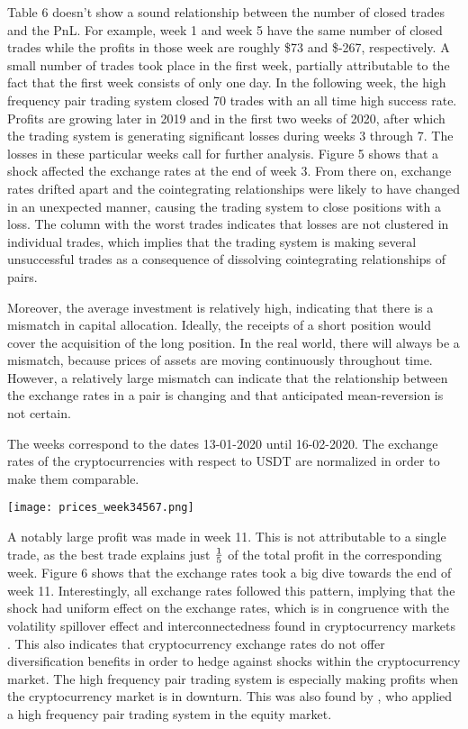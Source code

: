 \documentclass[12pt,english,authoryear]{article}
\begin{document}
Table 6 doesn't show a sound relationship between the number of closed trades and the PnL. For example, week 1 and week 5 have the same number of closed trades while the profits in those week are roughly \$73 and \$-267, respectively. A small number of trades took place in the first week, partially attributable to the fact that the first week consists of only one day. In the following week, the high frequency pair trading system closed 70 trades with an all time high success rate. Profits are growing later in 2019 and in the first two weeks of 2020, after which the trading system is generating significant losses during weeks 3 through 7. The losses in these particular weeks call for further analysis. Figure 5 shows that a shock affected the exchange rates at the end of week 3. From there on, exchange rates drifted apart and the cointegrating relationships were likely to have changed in an unexpected manner, causing the trading system to close positions with a loss. The column with the worst trades indicates that losses are not clustered in individual trades, which implies that the trading system is making several unsuccessful trades as a consequence of dissolving cointegrating relationships of pairs.

Moreover, the average investment is relatively high, indicating that there is a mismatch in capital allocation. Ideally, the receipts of a short position would cover the acquisition of the long position. In the real world, there will always be a mismatch, because prices of assets are moving continuously throughout time. However, a relatively large mismatch can indicate that the relationship between the exchange rates in a pair is changing and that anticipated mean-reversion is not certain.  

\begin{center}
\begin{minipage}{\textwidth}
\caption*{\footnotesize The weeks correspond to the dates 13-01-2020 until 16-02-2020. The exchange rates of the cryptocurrencies with respect to USDT are normalized in order to make them comparable.}
\texttt{[image: prices\_week34567.png]}
\end{minipage}
\end{center}

A notably large profit was made in week 11. This is not attributable to a single trade, as the best trade explains just $1\over5$ of the total profit in the corresponding week. Figure 6 shows that the exchange rates took a big dive towards the end of week 11. Interestingly, all exchange rates followed this pattern, implying that the shock had uniform effect on the exchange rates, which is in congruence with the volatility spillover effect and interconnectedness found in cryptocurrency markets \cite{Ji_2019}. This also indicates that cryptocurrency exchange rates do not offer diversification benefits in order to hedge against shocks within the cryptocurrency market. The high frequency pair trading system is especially making profits when the cryptocurrency market is in downturn. This was also found by \cite{Miao_2014}, who applied a high frequency pair trading system in the equity market. 
\end{document}
